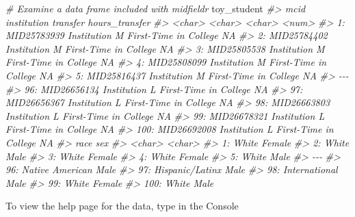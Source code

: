 \documentclass[
]{book}
\newenvironment{Shaded}{\begin{snugshade}}{\end{snugshade}}
\newcommand{\CommentTok}[1]{\textcolor[rgb]{0.56,0.35,0.01}{\textit{#1}}}
\newcommand{\NormalTok}[1]{#1}
\begin{document}
\begin{Shaded}
\begin{Highlighting}[]
\CommentTok{\# Examine a data frame included with midfieldr}
\NormalTok{toy\_student}
\CommentTok{\#\textgreater{}             mcid   institution              transfer hours\_transfer}
\CommentTok{\#\textgreater{}           \textless{}char\textgreater{}        \textless{}char\textgreater{}                \textless{}char\textgreater{}          \textless{}num\textgreater{}}
\CommentTok{\#\textgreater{}   1: MID25783939 Institution M First{-}Time in College             NA}
\CommentTok{\#\textgreater{}   2: MID25784402 Institution M First{-}Time in College             NA}
\CommentTok{\#\textgreater{}   3: MID25805538 Institution M First{-}Time in College             NA}
\CommentTok{\#\textgreater{}   4: MID25808099 Institution M First{-}Time in College             NA}
\CommentTok{\#\textgreater{}   5: MID25816437 Institution M First{-}Time in College             NA}
\CommentTok{\#\textgreater{}  {-}{-}{-}                                                               }
\CommentTok{\#\textgreater{}  96: MID26656134 Institution L First{-}Time in College             NA}
\CommentTok{\#\textgreater{}  97: MID26656367 Institution L First{-}Time in College             NA}
\CommentTok{\#\textgreater{}  98: MID26663803 Institution L First{-}Time in College             NA}
\CommentTok{\#\textgreater{}  99: MID26678321 Institution L First{-}Time in College             NA}
\CommentTok{\#\textgreater{} 100: MID26692008 Institution L First{-}Time in College             NA}
\CommentTok{\#\textgreater{}                 race    sex}
\CommentTok{\#\textgreater{}               \textless{}char\textgreater{} \textless{}char\textgreater{}}
\CommentTok{\#\textgreater{}   1:           White Female}
\CommentTok{\#\textgreater{}   2:           White   Male}
\CommentTok{\#\textgreater{}   3:           White Female}
\CommentTok{\#\textgreater{}   4:           White Female}
\CommentTok{\#\textgreater{}   5:           White   Male}
\CommentTok{\#\textgreater{}  {-}{-}{-}                       }
\CommentTok{\#\textgreater{}  96: Native American   Male}
\CommentTok{\#\textgreater{}  97: Hispanic/Latinx   Male}
\CommentTok{\#\textgreater{}  98:   International   Male}
\CommentTok{\#\textgreater{}  99:           White Female}
\CommentTok{\#\textgreater{} 100:           White   Male}
\end{Highlighting}
\end{Shaded}

To view the help page for the data, type in the Console
\end{document}
